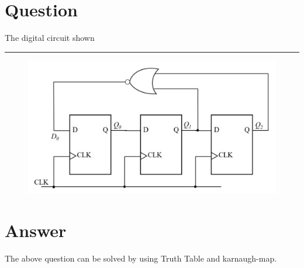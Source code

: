 \documentclass[journal,12pt,twocolumn]{IEEEtran}
\title{\ktitle}
\author{\kauthor\\\kcontact\\\kmodule}
\begin{document}
\maketitle
\tableofcontents
\section{\textbf{Question}}
 The digital circuit shown \rule{9mm}{0.4pt}
\begin{figure}[ht]
    \centering
    \includegraphics[width=0.45\columnwidth,height=0.45\columnwidth]{asmq.jpeg}
    \label{fig:enter-label}
\end{figure}
\section{\textbf{Answer}}
The above question can be solved by using Truth Table and karnaugh-map.
\end{document}
